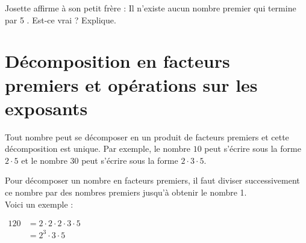 \documentclass[../../syllabus_1.tex]{subfiles}
\begin{document}
\begin{exercise}
      Josette affirme à son petit frère : \og Il n'existe aucun nombre premier qui termine par 5 \fg{}. Est-ce vrai ? Explique.
      \vspace{5em}
\end{exercise}


\newpage
\section{Décomposition en facteurs premiers et opérations sur les exposants}
Tout nombre peut se décomposer en un produit de facteurs premiers et cette décomposition est unique.
Par exemple, le nombre $10$ peut s'écrire sous la forme $2\cdot 5$ et le nombre $30$ peut s'écrire sous la forme $2\cdot 3 \cdot 5$.

Pour décomposer un nombre en facteurs premiers, il faut diviser successivement ce nombre par des nombres premiers jusqu'à obtenir le nombre 1.\\
Voici un exemple :
\begin{center}
      \hfil
      \(\begin{aligned}
            120
             & = 2\cdot 2 \cdot 2 \cdot 3 \cdot 5 \\
             & = 2^3 \cdot 3 \cdot 5              \\
      \end{aligned}\)
\end{center}
\end{document}
